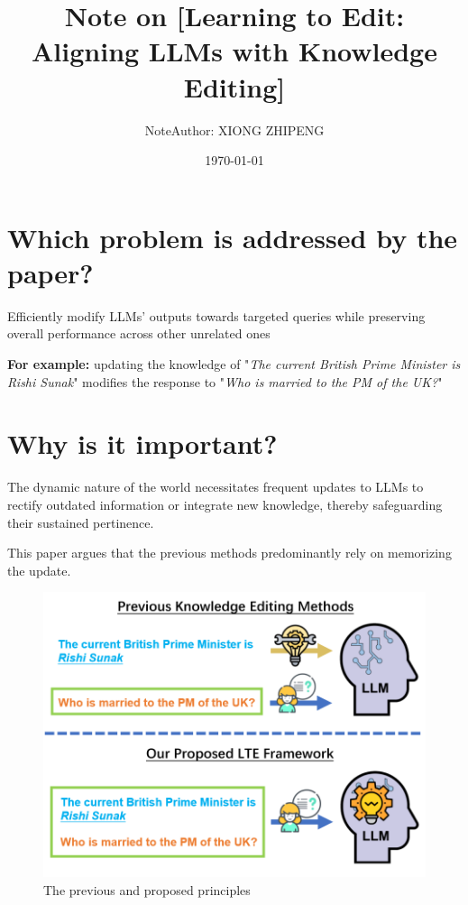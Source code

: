 \documentclass{article}
\title{Note on [Learning to Edit: Aligning LLMs with Knowledge Editing]}
\author{NoteAuthor: XIONG ZHIPENG}
\date{\today}
\begin{document}
\maketitle

\section{Which problem is addressed by the paper?}
Efficiently modify LLMs' outputs towards targeted queries while preserving overall performance across other unrelated ones

\textbf{For example:}
updating the knowledge of "\textit{The current British Prime Minister is Rishi Sunak}" 
modifies the response to "\textit{Who is married to the PM of the UK?}" 



\section{Why is it important?}

The dynamic nature of the world  necessitates frequent updates to LLMs to rectify outdated information 
or integrate new knowledge, thereby safeguarding their sustained pertinence.

This paper argues that the previous methods predominantly rely on memorizing 
the update.



\begin{figure}[H]
    \centering
    \includegraphics[width=\textwidth]{./../Images/Figure1.png}
    \caption{The previous and proposed principles}
\end{figure}
\end{document}
